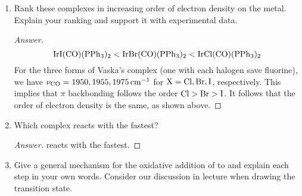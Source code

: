 \documentclass[../psets.tex]{subfiles}
\begin{document}
\begin{enumerate}
\begin{enumerate}
\begin{proof}[Answer]
\begin{center}
            \end{center}
            The first step is S\textsubscript{N}2, with Vaska's complex acting as the incoming nucleophile for the backside attack of methyl iodide. As a result of this step, the methyl group of methyl iodide bonds to Vaska's complex and the electrons that had been bonding the iodine to the methyl group get pushed back on to the electrophilic iodine, which then leaves. Newly saturated with electrons, the iodide ion engages in another backside attack, this time on Vaska's complex \emph{trans} to where the methyl added at the open octahedral coordination site.
        \end{proof}
        \item Rank these complexes in increasing order of electron density on the metal. Explain your ranking and support it with experimental data.
        \begin{proof}[Answer]
            \begin{equation*}
                \ce{IrI(CO)(PPh3)2}
                < \ce{IrBr(CO)(PPh3)2}
                < \ce{IrCl(CO)(PPh3)2}
            \end{equation*}
            For the three forms of Vaska's complex (one with each halogen save fluorine), we have $\nu_{\ce{CO}}=1950,1955,\SI{1975}{\per\centi\meter}$ for $\ce{X}=\ce{Cl},\ce{Br},\ce{I}$, respectively. This implies that $\pi$ backbonding follows the order $\ce{Cl}>\ce{Br}>\ce{I}$. It follows that the order of electron density is the same, as shown above.
        \end{proof}
        \item Which  complex reacts with  the fastest?
        \begin{proof}[Answer]
             reacts with  the fastest.
        \end{proof}
        \item Give a general mechanism for the oxidative addition of  to  and explain each step in your own words. Consider our discussion in lecture when drawing the transition state.

\end{enumerate}
\end{enumerate}
\end{document}
